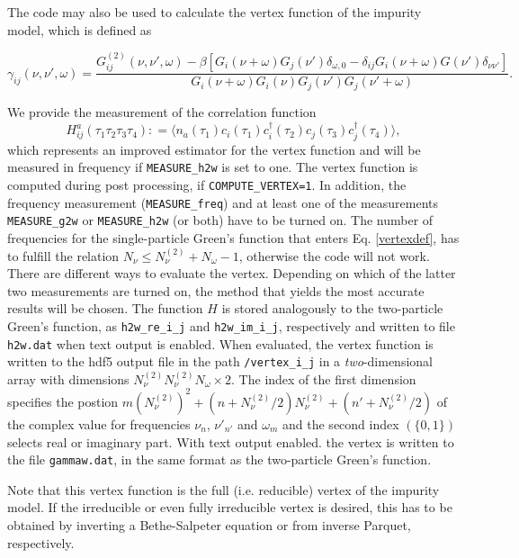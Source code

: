\documentclass[aps,prb,floatfix,superscriptaddress,twocolumn,notitlepage]{revtex4-1}
\newcommand\Let{\mathrel{\mathop:\!\!=}}
\begin{document}
The code may also be used to calculate the vertex function of the impurity model, which is defined as
\begin{widetext}
\begin{equation}
\gamma_{ij}(\nu,\nu',\omega) = \frac{G^{(2)}_{ij}(\nu,\nu',\omega) - \beta[G_{i}(\nu+\omega)G_{j}(\nu')\delta_{\omega,0} - \delta_{ij}G_{i}(\nu+\omega)G(\nu')\delta_{\nu\nu'}]}{G_{i}(\nu+\omega)G_{i}(\nu)G_{j}(\nu')G_{j}(\nu'+\omega)}.
\label{vertexdef}
\end{equation}
\end{widetext}
We provide the measurement of the correlation function
\begin{equation}
H^{a}_{ij}(\tau_{1}\tau_{2}\tau_{3}\tau_{4}) \Let \langle n_{a}(\tau_{1})c_{i}(\tau_{1})c^{\dagger}_{i}(\tau_{2})c_{j}(\tau_{3})c^{\dagger}_{j}(\tau_{4})\rangle,
\end{equation}
which represents an improved estimator for the vertex function\cite{Hafermann12} and will be measured in frequency if \verb#MEASURE_h2w# is set to one.
The vertex function is computed during post processing, if \verb#COMPUTE_VERTEX=1#. In addition, the frequency measurement (\verb#MEASURE_freq#) and at least one of the measurements \verb#MEASURE_g2w# or \verb#MEASURE_h2w# (or both) have to be turned on. The number of frequencies for the single-particle Green's function that enters Eq. \eqref{vertexdef}, has to fulfill the relation $N_{\nu}\leq N_{\nu}^{(2)}+N_{\omega}-1$, otherwise the code will not work.
There are different ways to evaluate the vertex. Depending on which of the latter two measurements are turned on, the method that yields the most accurate results will be chosen.
The function $H$ is stored analogously to the two-particle Green's function, as \verb#h2w_re_i_j# and \verb#h2w_im_i_j#, respectively and written to file \verb#h2w.dat# when text output is enabled.
When evaluated, the vertex function is written to the hdf5 output file in the path \verb#/vertex_i_j# in a \emph{two}-dimensional array with dimensions $N_{\nu}^{(2)}N_{\nu}^{(2)}N_{\omega}\times 2$. The index of the first dimension specifies the postion $m(N^{(2)}_\nu)^{2} + (n+N^{(2)}_{\nu}/2)N^{(2)}_{\nu} + (n'+N^{(2)}_{\nu}/2)$ of the complex value for frequencies $\nu_{n}$, $\nu'_{n'}$ and $\omega_{m}$ and the second index $(\{0,1\})$ selects real or imaginary part.
With text output enabled. the vertex is written to the file \verb#gammaw.dat#, in the same format as the two-particle Green's function.

Note that this vertex function is the full (i.e. reducible) vertex of the impurity model. If the irreducible or even fully irreducible vertex is desired, this has to be obtained by inverting a Bethe-Salpeter equation or from inverse Parquet, respectively.
\end{document}
